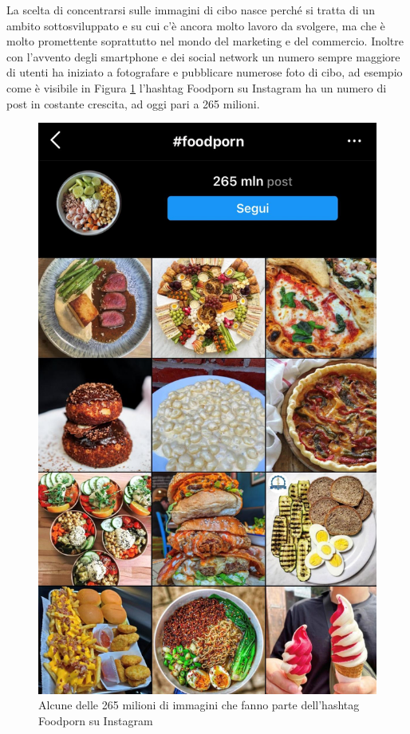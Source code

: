 La scelta di concentrarsi sulle immagini di cibo nasce perché si tratta di un ambito sottosviluppato e su cui c'è ancora molto lavoro da svolgere, ma che è molto promettente soprattutto nel mondo del marketing e del commercio. Inoltre con l'avvento degli smartphone e dei social network un numero sempre maggiore di utenti ha iniziato a fotografare e pubblicare numerose foto di cibo, ad esempio come è visibile in Figura \ref{foodporn} l'hashtag Foodporn su Instagram ha un numero di post in costante crescita, ad oggi pari a 265 milioni.
\begin{figure}[h!]
\centering
\includegraphics[scale=0.17]{images/foodporn_instagram.jpg}
\caption{Alcune delle 265 milioni di immagini che fanno parte dell'hashtag Foodporn su Instagram}
\label{foodporn}
\end{figure}

